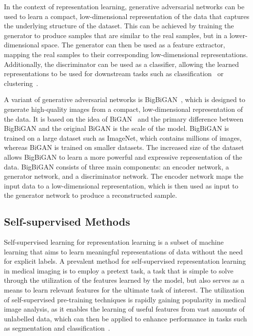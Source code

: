 In the context of representation learning, generative adversarial networks can be used to learn a compact, low-dimensional representation of the data that captures the underlying structure of the dataset. This can be achieved by training the generator to produce samples that are similar to the real samples, but in a lower-dimensional space. The generator can then be used as a feature extractor, mapping the real samples to their corresponding low-dimensional representations. Additionally, the discriminator can be used as a classifier, allowing the learned representations to be used for downstream tasks such as classification~\citep{srivastav2021improved} or clustering~\citep{mukherjee2019clustergan}.

A variant of generative adversarial networks is BigBiGAN~\citep{donahue2019large}, which is designed to generate high-quality images from a compact, low-dimensional representation of the data. It is based on the idea of BiGAN~\citep{donahue2016adversarial} and the primary difference between BigBiGAN and the original BiGAN is the scale of the model. BigBiGAN is trained on a large dataset such as ImageNet, which contains millions of images, whereas BiGAN is trained on smaller datasets. The increased size of the dataset allows BigBiGAN to learn a more powerful and expressive representation of the data. BigBiGAN consists of three main components: an encoder network, a generator network, and a discriminator network. The encoder network maps the input data to a low-dimensional representation, which is then used as input to the generator network to produce a reconstructed sample.

\subsection{Self-supervised Methods}
\label{subsec:self_supervised_methods}
Self-supervised learning for representation learning is a subset of machine learning that aims to learn meaningful representations of data without the need for explicit labels. A prevalent method for self-supervised representation learning in medical imaging is to employ a pretext task, a task that is simple to solve through the utilization of the features learned by the model, but also serves as a means to learn relevant features for the ultimate task of interest. The utilization of self-supervised pre-training techniques is rapidly gaining popularity in medical image analysis, as it enables the learning of useful features from vast amounts of unlabelled data, which can then be applied to enhance performance in tasks such as segmentation and classification~\citep{shurrab2022self}.

